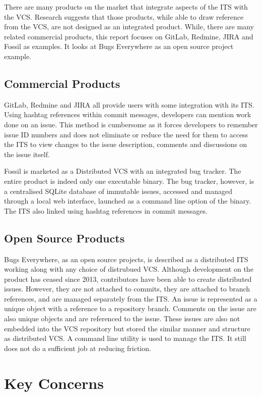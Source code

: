 \documentclass{mproj}
\begin{document}
There are many products on the market that integrate aspects of the ITS with the VCS. Research suggests that those products, while able to draw reference from the VCS, are not designed as an integrated product. While, there are many related commercial products, this report focuses on GitLab, Redmine, JIRA and Fossil as examples. It looks at Bugs Everywhere as an open source project example.

\subsection{Commercial Products}

GitLab, Redmine and JIRA all provide users with some integration with its ITS. Using hashtag references within commit messages, developers can mention work done on an issue. This method is cumbersome as it forces developers to remember issue ID numbers and does not eliminate or reduce the need for them to access the ITS to view changes to the issue description, comments and discussions on the issue itself.

Fossil is marketed as a Distributed VCS with an integrated bug tracker. The entire product is indeed only one executable binary. The bug tracker, however, is a centralised SQLite database of immutable issues, accessed and managed through a local web interface, launched as a command line option of the binary. The ITS also linked using hashtag references in commit messages.

\subsection{Open Source Products}

Bugs Everywhere, as an open source projects, is described as a distributed ITS working along with any choice of distrubued VCS. Although development on the product has ceased since 2013, contributors have been able to create distributed issues. However, they are not attached to commits, they are attached to branch references, and are managed separately from the ITS. An issue is represented as a unique object with a reference to a repository branch. Comments on the issue are also unique objects and are referenced to the issue. These issues are also not embedded into the VCS repository but stored the similar manner and structure as distributed VCS. A command line utility is used to manage the ITS. It still does not do a sufficient job at reducing friction.

\section{Key Concerns}
\end{document}
